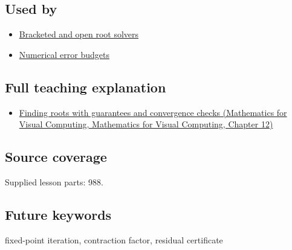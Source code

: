 \subsection{Used by}\label{appendix-d83b0ad1be7f-used-by}

\begin{itemize}
\tightlist
\item
  \hyperref[appendix-f63eb850796d]{Bracketed and open root solvers}
\item
  \hyperref[appendix-31b8c295e05f]{Numerical error budgets}
\end{itemize}

\subsection{Full teaching explanation}\label{appendix-d83b0ad1be7f-full-teaching-explanation}

\begin{itemize}
\tightlist
\item
  \href{../02-Mathematics-for-Visual-Computing/main.pdf\#nameddest=02-foundations-ii-ch028-finding-roots-with-guarantees-and-convergence-checks}{Finding roots with guarantees and convergence checks (Mathematics for Visual Computing, Mathematics for Visual Computing, Chapter 12)}
\end{itemize}

\subsection{Source coverage}\label{appendix-d83b0ad1be7f-source-coverage}

Supplied lesson parts: 988.

\subsection{Future keywords}\label{appendix-d83b0ad1be7f-future-keywords}

fixed-point iteration, contraction factor, residual certificate
